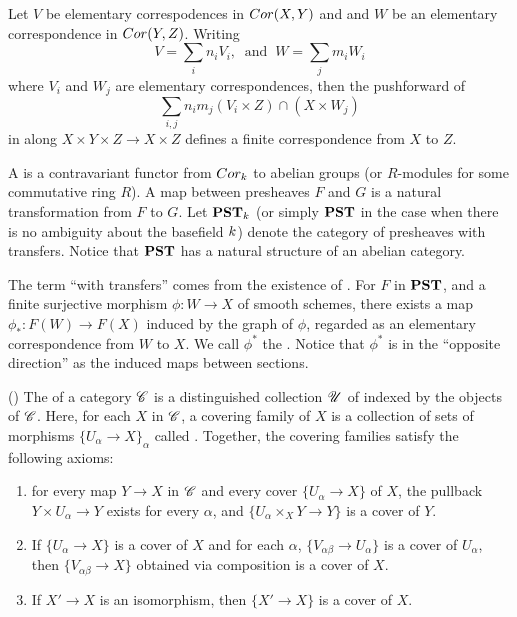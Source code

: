 \begin{lem}\label{lem_cor_composition}
Let $V$ be elementary correspodences in $Cor(X, Y)$
and and $W$ be an elementary correspondence in $Cor(Y, Z)$. 
Writing
\[
V = \sum_i n_i V_i, \;\;\textrm{and}\;\; W = \sum_j m_i W_i
\]
where $V_i$ and $W_j$ are elementary correspondences, then
the pushforward of
\[
\sum_{i, j} n_im_j (V_i \times Z) \cap (X \times W_j)
\]
in along $X \times Y \times Z \to X \times Z$ defines a finite 
correspondence from $X$ to $Z$.
\end{lem}

\begin{defn}\label{def_pst}
A  is a contravariant functor from 
$Cor_k$ to abelian groups (or $R$-modules for some commutative 
ring $R$). A map between presheaves $F$ and $G$ is a natural 
transformation from $F$ to $G$. Let $\mathbf{PST}_{k}$ (or simply 
$\mathbf{PST}$ in the case when there is no ambiguity about the basefield 
$k$) denote the category of presheaves with transfers. 
Notice that $\mathbf{PST}$ has a natural structure of an abelian category.
\end{defn}

\begin{rmk}
The term ``with transfers'' comes from the existence of 
. For $F$ in $\mathbf{PST}$, and a finite surjective
morphism $\phi : W \to X$ of smooth schemes, there exists a
map $\phi_*: F(W) \to F(X)$ induced by the graph of $\phi$,
regarded as an elementary correspondence from $W$ to $X$.
We call $\phi^*$ the . Notice that $\phi^*$
is in the ``opposite direction'' as the induced maps between
sections.
\end{rmk}

\begin{defn}\label{def_groth_top} (\cite[II.1.3]{SGA4})
The  of a category $\mathscr{C}$ 
is a distinguished collection $\mathscr{U}$ of  
indexed by the objects of $\mathscr{C}$. Here, for each $X$ in $\mathscr{C}$,
a covering family of $X$ is a collection of sets of morphisms 
$\{U_\alpha \to X\}_\alpha$ called . Together, 
the covering families satisfy the following axioms:

\begin{enumerate}
\item for every map $Y \to X$ in $\mathscr{C}$ and every cover 
$\{U_\alpha \to X\}$ of $X$, the pullback $Y \times U_\alpha \to 
Y$ exists for every $\alpha$, and $\{U_\alpha \times_X Y \to Y\}$ 
is a cover of $Y$.

\item If $\{U_\alpha \to X\}$ is a cover of $X$ and for each 
$\alpha$, $\{V_{\alpha\beta} \to U_\alpha\}$ is a cover of 
$U_\alpha$, then $\{V_{\alpha\beta} \to X\}$ obtained via 
composition is a cover of $X$.

\item If $X' \to X$ is an isomorphism, then $\{X' \to X\}$ is a 
cover of $X$.
\end{enumerate}
\end{defn}

